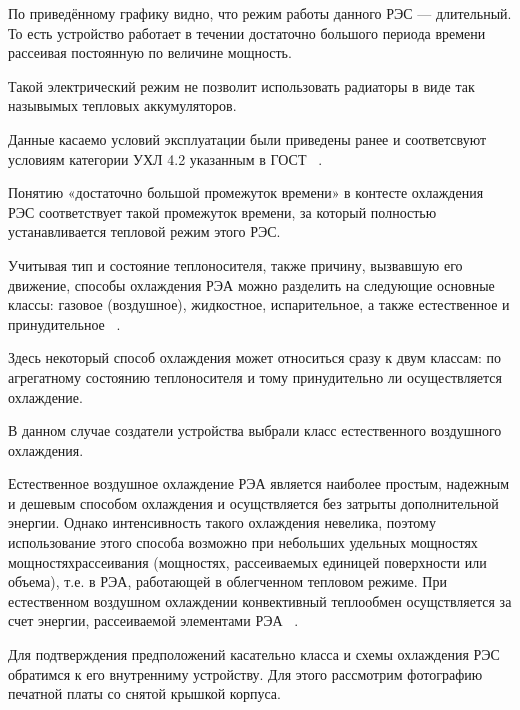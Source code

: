 По приведённому графику видно, что режим работы данного РЭС —
длительный. То есть устройство работает в течении достаточно большого
периода времени рассеивая постоянную по величине мощность.

Такой электрический режим не позволит использовать радиаторы в виде
так назывымых тепловых аккумуляторов.

Данные касаемо условий эксплуатации были приведены ранее и
соответсвуют условиям категории УХЛ 4.2 указанным в ГОСТ
~\cite{GOST-15150-69}.

Понятию «достаточно большой промежуток времени» в контесте охлаждения
РЭС соответствует такой промежуток времени, за который полностью
устанавливается тепловой режим этого РЭС.

Учитывая тип и состояние теплоносителя, также причину, вызвавшую его
движение, способы охлаждения РЭА можно разделить на следующие основные
классы: газовое (воздушное), жидкостное, испарительное, а также
естественное и принудительное ~\cite{Rotkop1976}.

Здесь некоторый способ охлаждения может относиться сразу к двум
классам: по агрегатному состоянию теплоносителя и тому принудительно
ли осуществляется охлаждение.

В данном случае создатели устройства выбрали класс естественного
воздушного охлаждения.

Естественное воздушное охлаждение РЭА является наиболее простым,
надежным и дешевым способом охлаждения и осущствляется без затрыты
дополнительной энергии. Однако интенсивность такого охлаждения
невелика, поэтому использование этого способа возможно при небольших
удельных мощностях мощностяхрассеивания (мощностях, рассеиваемых
единицей поверхности или объема), т.е. в РЭА, работающей в облегченном
тепловом режиме. При естественном воздушном охлаждении конвективный
теплообмен осущствляется за счет энергии, рассеиваемой элементами РЭА ~\cite{Rotkop1976}.

Для подтверждения предположений касательно класса и схемы охлаждения
РЭС обратимся к его внутренниму устройству. Для этого рассмотрим
фотографию печатной платы со снятой крышкой корпуса.


